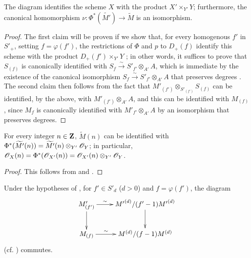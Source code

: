 \begin{proposition}[2.8.10]
\label{II.2.8.10}
The diagram  identifies the scheme $X$ with the product $X'\times_{Y'}Y$;
furthermore, the canonical homomorphism $\nu:\Phi^*(\widetilde{M'})\to\widetilde{M}$  is an isomorphism.
\end{proposition}

\begin{proof}
The first claim will be proven if we show that, for every homogenous $f'$ in $S'_+$, setting $f=\varphi(f')$, the restrictions of $\Phi$ and $p$ to $D_+(f)$ identify this scheme with the product $D_+(f')\times_{Y'}Y$ ;
in other words, it suffices  to prove that $S_{(f)}$ is canonically identified with $S_f\xrightarrow{\sim}S'_{f'}\otimes_{A'}A$, which is immediate by the existence of the canonical isomorphism $S_f\xrightarrow{\sim}S'_{f'}\otimes_{A'}A$ that preserves degrees .
The second claim then follows from the fact that $M'_{(f')}\otimes_{S'_{(f')}}S_{(f)}$ can be identified, by the above, with $M'_{(f')}\otimes_{A'}A$, and this can be identified with $M_{(f)}$, since $M_f$ is canonically identified with $M'_{f'}\otimes_{A'}A$ by an isomorphism that preserves degrees.
\end{proof}

\begin{corollary}[2.8.11]
\label{II.2.8.11}
For every integer $n\in\mathbf{Z}$, $\widetilde{M}(n)$ can be identified with $\Phi^*(\widetilde{M'}(n))=\widetilde{M'}(n)\otimes_{Y'}\mathscr{O}_Y$;
in particular, $\mathscr{O}_X(n)=\Phi^*(\mathscr{O}_{X'}(n))=\mathscr{O}_{X'}(n)\otimes_{Y'}\mathscr{O}_Y$.
\end{corollary}

\begin{proof}
This follows from  and .
\end{proof}


\begin{env}[2.8.12]
\label{II.2.8.12}
Under the hypotheses of , for $f'\in S'_d$ ($d>0$) and $f=\varphi(f')$, the diagram
\[
  \xymatrix{
    M'_{(f')} \ar[r]^-{\sim} \ar[d]
    & {M'}^{(d)}/(f'-1){M'}^{(d)} \ar[d]
  \\M_{(f)} \ar[r]^-{\sim}
    & M^{(d)}/(f-1)M^{(d)}
  }
\]
(cf. ) commutes.
\end{env}

